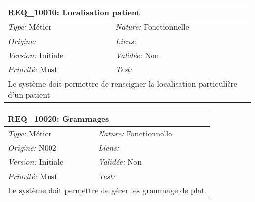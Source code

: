 \begin{table}[!h]

\begin{tabular}{|p{60mm}p{100mm}|}

\hline

\multicolumn{2}{|l|}{\textbf{REQ\_10010:} Localisation patient} \\ \hline

\emph{Type:} Métier & \emph{Nature:} Fonctionnelle \\

\emph{Origine:}  & \emph{Liens:}  \\

\emph{Version:} Initiale & \emph{Validée:} Non \\

\emph{Priorité:} Must & \emph{Test:} \\ \hline

\multicolumn{2}{|p{16cm}|}{Le système doit permettre de renseigner la localisation particulière d'un patient.} \\ \hline

\end{tabular}

\end{table}



\begin{table}[!h]

\begin{tabular}{|p{60mm}p{100mm}|}

\hline

\multicolumn{2}{|l|}{\textbf{REQ\_10020:} Grammages} \\ \hline

\emph{Type:} Métier & \emph{Nature:} Fonctionnelle \\

\emph{Origine:} N002 & \emph{Liens:}  \\

\emph{Version:} Initiale & \emph{Validée:} Non \\

\emph{Priorité:} Must & \emph{Test:} \\ \hline

\multicolumn{2}{|p{16cm}|}{Le système doit permettre de gérer les grammage de plat.} \\ \hline

\end{tabular}

\end{table}



